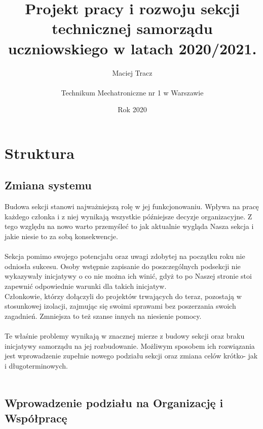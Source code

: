 \documentclass[9pt,a4paper]{report}
\begin{document}
\title{\Huge Projekt pracy i rozwoju sekcji technicznej samorządu uczniowskiego w latach 2020/2021.}
\author{Maciej Tracz \\\\Technikum Mechatroniczne nr 1 w Warszawie}
\date{Rok 2020}
\maketitle

\newpage
\tableofcontents
\newpage

\chapter{Struktura} 

 

\section{Zmiana systemu} 

Budowa sekcji stanowi najważniejszą rolę w jej funkcjonowaniu. Wpływa na pracę każdego członka i z niej wynikają wszystkie późniejsze decyzje organizacyjne. Z tego względu na nowo warto przemyśleć to jak aktualnie wygląda Nasza sekcja i jakie niesie to za sobą konsekwencje.\\\\ 

Sekcja pomimo swojego potencjału oraz uwagi zdobytej na początku roku nie odniosła sukcesu. Osoby wstępnie zapisanie do poszczególnych podsekcji nie wykazywały inicjatywy o co nie można ich winić, gdyż to po Naszej stronie stoi zapewnić odpowiednie warunki dla takich inicjatyw.\\Członkowie, którzy dołączyli do projektów trwających do teraz, pozostają w stosunkowej izolacji, zajmując się swoimi sprawami bez poszerzania swoich zagadnień. Zmniejsza to też szanse innych na niesienie pomocy.\\\\ 

Te właśnie problemy wynikają w znacznej mierze z budowy sekcji oraz braku inicjatywy samorządu na jej rozbudowanie. Możliwym sposobem ich rozwiązania jest wprowadzenie zupełnie nowego podziału sekcji oraz zmiana celów krótko- jak i długoterminowych.\\\\ 

\section{Wprowadzenie podziału na Organizację i Współpracę} 
\end{document}
